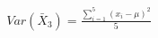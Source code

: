 \documentclass[preview]{standalone}
\begin{document}
\begin{align*}
Var(\bar{X}_3) = \frac{\sum_{i=1}^{5}(x_i - \mu)^2}{5}
\end{align*}
\end{document}
